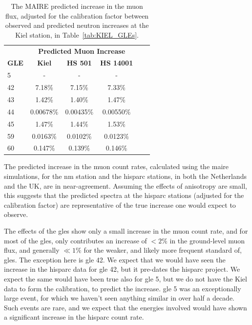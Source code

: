 \begin{table}[ht!]
	\begin{center}
		\caption{The MAIRE predicted increase in the muon flux, adjusted for the calibration factor between observed and predicted neutron increases at the Kiel station, in Table~\ref{tab:KIEL_GLEs}.}
		\label{tab:MAIRE_muons}
		\begin{tabular}{l c c c c c}
			\hline
			&  \multicolumn{3}{c}{\bf Predicted Muon Increase} \\
			{\bf GLE} & {\bf Kiel} & {\bf HS 501} & {\bf HS 14001} \\
			\hline
			5 & - & - & - \\
			42 & 7.18\%    & 7.15\%    & 7.33\%  \\
			43 & 1.42\%    & 1.40\%    & 1.47\%  \\
			44 & 0.00678\% & 0.00435\% & 0.00550\%  \\
			45 & 1.47\%    & 1.44\%    & 1.53\%  \\
			59 & 0.0163\%  & 0.0102\%  & 0.0123\%  \\
			60 & 0.147\%   & 0.139\%   & 0.146\%  \\
			\hline
		\end{tabular}
	\end{center}
\end{table}


The predicted increase in the muon count rates, calculated using the \gls{maire} simulations, for the \gls{nm} station and the \gls{hisparc} stations, in both the Netherlands and the UK, are in near-agreement. Assuming the effects of anisotropy are small, this suggests that the predicted spectra at the \gls{hisparc} stations (adjusted for the calibration factor) are representative of the true increase one would expect to observe.

The effects of the \glspl{gle} show only a small increase in the muon count rate, and for most of the \glspl{gle}, only contributes an increase of $< 2 \%$ in the ground-level muon flux, and generally $\ll 1\%$ for the weaker, and likely more frequent standard of, \glspl{gle}. The exception here is \gls{gle} 42. We expect that we would have seen the increase in the \gls{hisparc} data for \gls{gle} 42, but it pre-dates the \gls{hisparc} project. We expect the same would have been true also for \gls{gle} 5, but we do not have the Kiel data to form the calibration, to predict the increase. \gls{gle} 5 was an exceptionally large event, for which we haven't seen anything similar in over half a decade. Such events are rare, and we expect that the energies involved would have shown a significant increase in the \gls{hisparc} count rate.

